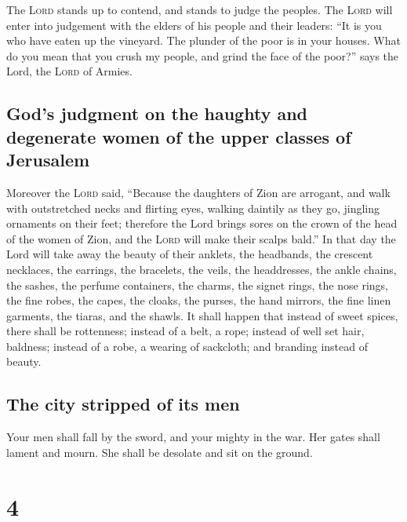  The \textsc{Lord} stands up to contend, and stands to
judge the peoples.  The \textsc{Lord} will enter into
judgement with the elders of his people and their leaders: ``It is you
who have eaten up the vineyard. The plunder of the poor is in your
houses.  What do you mean that you crush my people, and
grind the face of the poor?'' says the Lord, the \textsc{Lord} of
Armies.

\hypertarget{gods-judgment-on-the-haughty-and-degenerate-women-of-the-upper-classes-of-jerusalem}{%
\subsection{God's judgment on the haughty and degenerate women of the
upper classes of
Jerusalem}\label{gods-judgment-on-the-haughty-and-degenerate-women-of-the-upper-classes-of-jerusalem}}

 Moreover the \textsc{Lord} said, ``Because the daughters
of Zion are arrogant, and walk with outstretched necks and flirting
eyes, walking daintily as they go, jingling ornaments on their feet;
 therefore the Lord brings sores on the crown of the head
of the women of Zion, and the \textsc{Lord} will make their scalps
bald.''  In that day the Lord will take away the beauty
of their anklets, the headbands, the crescent necklaces, 
the earrings, the bracelets, the veils,  the headdresses,
the ankle chains, the sashes, the perfume containers, the charms,
 the signet rings, the nose rings,  the
fine robes, the capes, the cloaks, the purses,  the hand
mirrors, the fine linen garments, the tiaras, and the shawls.
 It shall happen that instead of sweet spices, there
shall be rottenness; instead of a belt, a rope; instead of well set
hair, baldness; instead of a robe, a wearing of sackcloth; and branding
instead of beauty.

\hypertarget{the-city-stripped-of-its-men}{%
\subsection{The city stripped of its
men}\label{the-city-stripped-of-its-men}}

 Your men shall fall by the sword, and your mighty in the
war.  Her gates shall lament and mourn. She shall be
desolate and sit on the ground.

\hypertarget{section-3}{%
\section{4}\label{section-3}}

